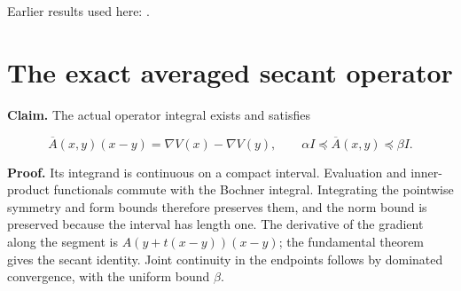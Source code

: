 \documentclass[11pt,a4paper]{article}
\begin{document}
Earlier results used here: \cite[Section~3.2.3]{LangevinLean2026ULASC}.

\section{\texorpdfstring{The exact averaged secant operator}{The exact averaged secant operator}}


\textbf{Claim.} The actual operator integral exists and satisfies

\[\overline A(x,y)(x-y)=\nabla V(x)-\nabla V(y),\qquad \alpha I\preceq\overline A(x,y)\preceq\beta I.\]

\textbf{Proof.} Its integrand is continuous on a compact interval. Evaluation and inner-product functionals commute with the Bochner integral. Integrating the pointwise symmetry and form bounds therefore preserves them, and the norm bound is preserved because the interval has length one. The derivative of the gradient along the segment is \(A(y+t(x-y))(x-y)\); the fundamental theorem gives the secant identity. Joint continuity in the endpoints follows by dominated convergence, with the uniform bound \(\beta\).
\end{document}
